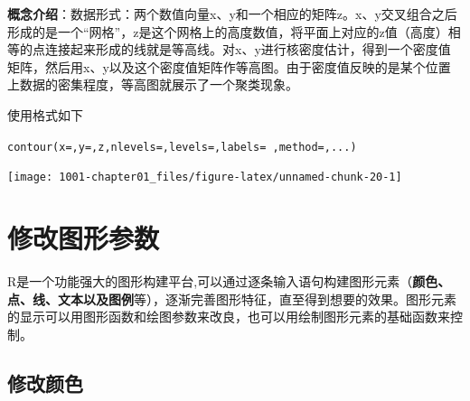 \documentclass[
]{book}
\newenvironment{Shaded}{\begin{snugshade}}{\end{snugshade}}
\newcommand{\AttributeTok}[1]{\textcolor[rgb]{0.77,0.63,0.00}{#1}}
\newcommand{\CommentTok}[1]{\textcolor[rgb]{0.56,0.35,0.01}{\textit{#1}}}
\newcommand{\DecValTok}[1]{\textcolor[rgb]{0.00,0.00,0.81}{#1}}
\newcommand{\FunctionTok}[1]{\textcolor[rgb]{0.00,0.00,0.00}{#1}}
\newcommand{\NormalTok}[1]{#1}
\newcommand{\OtherTok}[1]{\textcolor[rgb]{0.56,0.35,0.01}{#1}}
\newcommand{\SpecialCharTok}[1]{\textcolor[rgb]{0.00,0.00,0.00}{#1}}
\newcommand{\StringTok}[1]{\textcolor[rgb]{0.31,0.60,0.02}{#1}}
\begin{document}
\textbf{概念介绍}：数据形式：两个数值向量x、y和一个相应的矩阵z。x、y交叉组合之后形成的是一个``网格''，z是这个网格上的高度数值，将平面上对应的z值（高度）相等的点连接起来形成的线就是等高线。对x、y进行核密度估计，得到一个密度值矩阵，然后用x、y以及这个密度值矩阵作等高图。由于密度值反映的是某个位置上数据的密集程度，等高图就展示了一个聚类现象。

使用格式如下

\texttt{contour(x=,y=,z,nlevels=,levels=,labels=\ ,method=,...)}

\begin{Shaded}
\end{Shaded}

\begin{center}\texttt{[image: 1001-chapter01\_files/figure-latex/unnamed-chunk-20-1]} \end{center}

\hypertarget{ux4feeux6539ux56feux5f62ux53c2ux6570}{%
\section{修改图形参数}\label{ux4feeux6539ux56feux5f62ux53c2ux6570}}

R是一个功能强大的图形构建平台,可以通过逐条输入语句构建图形元素（\textbf{颜色、点、线、文本以及图例}等），逐渐完善图形特征，直至得到想要的效果。图形元素的显示可以用图形函数和绘图参数来改良，也可以用绘制图形元素的基础函数来控制。

\hypertarget{ux4feeux6539ux989cux8272}{%
\subsection{修改颜色}\label{ux4feeux6539ux989cux8272}}
\end{document}
